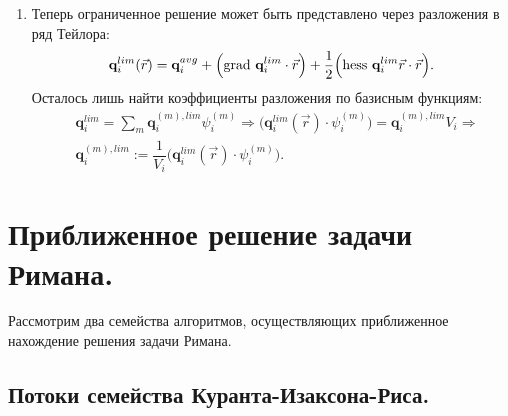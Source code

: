 \documentclass[14pt, a4paper, fleqn]{extreport}
\begin{document}
\begin{enumerate}
	\item 
	Теперь ограниченное решение может быть представлено через
	разложения в ряд Тейлора:
	\begin{equation*}
		\textbf{q}_i^{lim}(\vec{r}) 
			= \textbf{q}_i^{avg} 
			+ \Big( \text{grad }{\textbf{q}}_i^{lim} \cdot \vec{r} \Big)
			+ \dfrac{1}{2} \Big( \text{hess }{\textbf{q}}_i^{lim}\vec{r} \cdot \vec{r} \Big).
	\end{equation*}
	Осталось лишь найти коэффициенты разложения по базисным функциям:
	\begin{equation*}
	\begin{split}
		&\textbf{q}_i^{lim} 
			= \sum\limits_{m} \textbf{q}_i^{(m),lim} \psi_i^{(m)} \Rightarrow
				\Big( \textbf{q}_i^{lim}(\vec{r}) \cdot \psi_i^{(m)} \Big) = \textbf{q}_i^{(m),lim}V_i \Rightarrow \\
		&\textbf{q}_i^{(m),lim} 
			:= \dfrac{1}{V_i}\Big( \textbf{q}_i^{lim}(\vec{r}) \cdot \psi_i^{(m)} \Big).
	\end{split}
	\end{equation*}
	
	\end{enumerate}
	

	\section{Приближенное решение задачи Римана.}
		
	Рассмотрим два семейства алгоритмов, осуществляющих
	приближенное нахождение решения задачи Римана.
	
	\subsection{Потоки семейства Куранта-Изаксона-Риса.}
	
\end{document}
